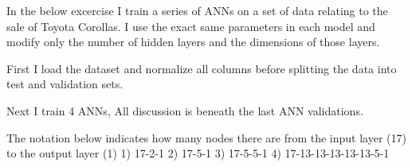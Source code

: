 \documentclass[]{article}
\newenvironment{Shaded}{\begin{snugshade}}{\end{snugshade}}
\newcommand{\KeywordTok}[1]{\textcolor[rgb]{0.13,0.29,0.53}{\textbf{#1}}}
\newcommand{\DataTypeTok}[1]{\textcolor[rgb]{0.13,0.29,0.53}{#1}}
\newcommand{\DecValTok}[1]{\textcolor[rgb]{0.00,0.00,0.81}{#1}}
\newcommand{\FloatTok}[1]{\textcolor[rgb]{0.00,0.00,0.81}{#1}}
\newcommand{\StringTok}[1]{\textcolor[rgb]{0.31,0.60,0.02}{#1}}
\newcommand{\OtherTok}[1]{\textcolor[rgb]{0.56,0.35,0.01}{#1}}
\newcommand{\OperatorTok}[1]{\textcolor[rgb]{0.81,0.36,0.00}{\textbf{#1}}}
\newcommand{\NormalTok}[1]{#1}
\begin{document}
In the below excercise I train a series of ANNs on a set of data
relating to the sale of Toyota Corollas. I use the exact same parameters
in each model and modify only the number of hidden layers and the
dimensions of those layers.

First I load the dataset and normalize all columns before splitting the
data into test and validation sets.

Next I train 4 ANNs, All discussion is beneath the last ANN validations.

The notation below indicates how many nodes there are from the input
layer (17) to the output layer (1) 1) 17-2-1 2) 17-5-1 3) 17-5-5-1 4)
17-13-13-13-13-13-5-1

\begin{Shaded}
\end{Shaded}
\end{document}
